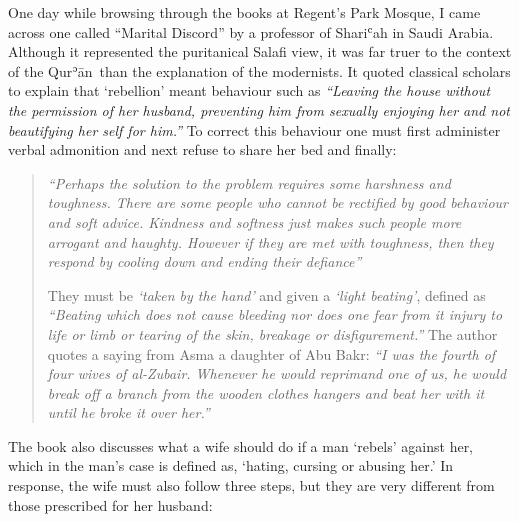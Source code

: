 \documentclass[12pt]{memoir}
\def\´{ʾ} %
\def\`{ʿ} %
\newcommand{\cor}[2]{#2} %
\def \Quran{Qur\-\´ān} %
\def\–{-\hskip0pt}
\begin{document}
One day while browsing through the books
at \cor{Regents}{Regent’s} Park Mosque,
I came across one called “Marital Discord”
by a professor of Shari\`ah in Saudi Arabia.
Although it represented the puritanical Salafi view,
it was far truer to the context of the \Quran\
than the explanation of the modernists.
It quoted classical scholars to explain that ‘rebellion’ meant behaviour
such as \emph{“Leaving the house without the permission of her husband,
preventing him from sexually enjoying her
and not beautifying her self for him.”}
To correct this behaviour one must first administer verbal admonition
and next refuse to share her bed and finally:

\begin{quote}
\emph{%
“Perhaps the solution to the problem requires some harshness and toughness.
There are some people who cannot be rectified
by good behaviour and soft advice.
Kindness and softness just makes such people more arrogant and haughty.
However if they are met with toughness,
then they respond by cooling down and ending their defiance”}

They must be \emph{‘taken by the hand’}
and given a \emph{‘light beating’}, defined as
\emph{“Beating which does not cause bleeding nor does one fear from it
injury to life or limb or tearing of the skin, breakage or disfigurement.”}
The author quotes a saying from Asma a daughter of Abu Bakr:
\emph{“I was the fourth of four wives of al\–Zubair.
Whenever he would reprimand one of us,
he would break off a branch from the wooden clothes hangers
and beat her with it until he broke it over her.”}
\end{quote}

The book also discusses what a wife should do if a man ‘rebels’ against her,
which in the man’s case is defined as, ‘hating, cursing or abusing her.’
In response, the wife must also follow three steps,
but they are very different from those prescribed for her husband:
\end{document}

